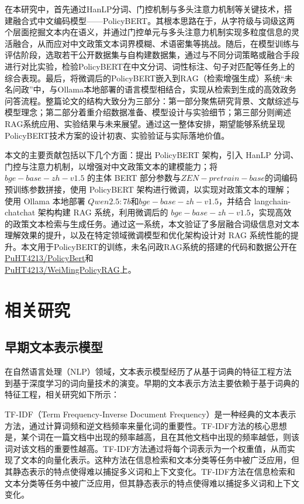 \documentclass[12pt, a4paper]{ctexart}
\begin{document}
在本研究中，首先通过HanLP分词、门控机制与多头注意力机制等关键技术，搭建融合式中文编码模型——PolicyBERT。其根本思路在于，从字符级与词级这两个层面挖掘文本内在语义，并通过门控单元与多头注意力机制实现多粒度信息的灵活融合，从而应对中文政策文本词界模糊、术语密集等挑战。随后，在模型训练与评估阶段，选取若干公开数据集与自构建数据集，通过与不同分词策略或融合手段进行对比实验，检验PolicyBERT在中文分词、词性标注、句子对匹配等任务上的综合表现。最后，将微调后的PolicyBERT嵌入到RAG（检索增强生成）系统“未名问政”中，与Ollama本地部署的语言模型相结合，实现从检索到生成的高效政务问答流程。整篇论文的结构大致分为三部分：第一部分聚焦研究背景、文献综述与模型理念；第二部分着重介绍数据准备、模型设计与实验细节；第三部分则阐述RAG系统应用、实验结果与未来展望。通过这一整体安排，期望能够系统呈现PolicyBERT技术方案的设计初衷、实验验证与实际落地价值。

本文的主要贡献包括以下几个方面：提出 PolicyBERT 架构，引入 HanLP 分词、门控与注意力机制，以增强对中文政策文本的建模能力；将 $ bge-base-zh-v1.5 $ 的主体 BERT 部分参数与$ZEN-pretrain-base$的词编码预训练参数拼接，使用 PolicyBERT 架构进行微调，以实现对政策文本的理解；使用 Ollama 本地部署 $Qwen2.5:7b$和$ bge-base-zh-v1.5 $，并结合 langchain-chatchat 架构构建 RAG 系统，利用微调后的 $ bge-base-zh-v1.5 $，实现高效的政策文本检索与生成任务。通过这一系统，本文验证了多层融合词级信息对文本理解效果的提升，以及在特定领域微调模型和优化架构设计对 RAG 系统性能的提升。本文用于PolicyBERT的训练，未名问政RAG系统的搭建的代码和数据公开在\href{https://github.com/PuHT4213/PolicyBert}{\underline{PuHT4213/PolicyBert}}和\\\href{https://github.com/PuHT4213/WeiMingPolicyRAG}{\underline{PuHT4213/WeiMingPolicyRAG}}上。




\section{相关研究}

\subsection{早期文本表示模型}
在自然语言处理（NLP）领域，文本表示模型经历了从基于词典的特征工程方法到基于深度学习的词向量技术的演变。早期的文本表示方法主要依赖于基于词典的特征工程，相关研究如下所示：

TF-IDF（Term Frequency-Inverse Document Frequency）是一种经典的文本表示方法，通过计算词频和逆文档频率来量化词的重要性\cite{SALTON1988513}。TF-IDF方法的核心思想是，某个词在一篇文档中出现的频率越高，且在其他文档中出现的频率越低，则该词对该文档的重要性越高。TF-IDF方法通过将每个词表示为一个权重值，从而实现了文本的向量化表示。这种方法在信息检索和文本分类等任务中被广泛应用，但其静态表示的特点使得难以捕捉多义词和上下文变化。TF-IDF方法在信息检索和文本分类等任务中被广泛应用，但其静态表示的特点使得难以捕捉多义词和上下文变化。
\end{document}
